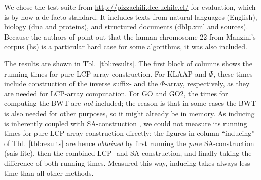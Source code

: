 \documentclass[11pt,onecolumn,final]{article} \usepackage[latin1]{inputenc}
\theoremstyle{plain}
\theoremstyle{remark}
\begin{document}
We chose the test suite from \url{http://pizzachili.dcc.uchile.cl/} for evaluation, which is by now a de-facto standard. It includes texts from natural languages (English), biology (dna and proteins), and structured documents (dblp.xml and sources). Because the authors of \cite{gog11fast} point out that the human chromosome 22 from Manzini's corpus (hs) is a particular hard case for some algorithms, it was also included.

The results are shown in Tbl.~\ref{tbl:results}. The first block of columns shows the running times for pure LCP-array construction. For \textsf{KLAAP} and $\Phi$, these times include construction of the inverse suffix- and the $\Phi$-array, respectively, as they are needed for LCP-array computation. For \textsf{GO} and \textsf{GO2}, the times for computing the BWT are \emph{not} included; the reason is that in some cases the BWT is also needed for other purposes, so it might already be in memory. As \textsf{inducing} is inherently coupled with SA-construction \cite{nong09linear}, we could not measure its running times for pure LCP-array construction directly; the figures in column ``\textsf{inducing}'' of Tbl.~\ref{tbl:results} are hence \emph{obtained} by first running the \emph{pure} SA-construction (\textsf{sais-lite}), then the combined LCP- and SA-construction, and finally taking the difference of both running times. Measured this way, \textsf{inducing} takes always less time than all other methods.
\end{document}
